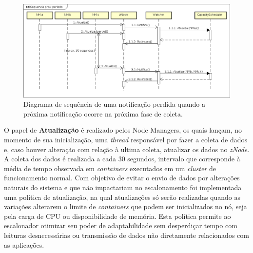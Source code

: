 \begin{figure}[!hbtn]
   \centering
   \includegraphics[width=\textwidth]{figuras/seq-prox-per.png}
   \caption{Diagrama de sequência de uma notificação perdida quando a próxima notificação ocorre na próxima fase de coleta.}
   \label{fig:proximo}
\end{figure}

	
O papel de \textbf{Atualização} é realizado pelos Node Managers, os quais lançam, no momento de sua inicialização, uma \textit{thread} responsável por fazer a coleta de dados e, caso houver alteração com relação à ultima coleta, atualizar os dados no \textit{zNode}. A coleta dos dados é realizada a cada 30 segundos, intervalo que corresponde à média de tempo observada em \textit{containers} executados em um \textit{cluster} de funcionamento normal. Com objetivo de evitar o envio de dados por alterações naturais do sistema e que não impactariam no escalonamento foi implementada uma política de atualização, na qual atualizações só serão realizadas quando as variações alterarem o limite de \textit{containers} que podem ser inicializados no nó, seja pela carga de CPU ou disponibilidade de memória. Esta política permite ao escalonador otimizar seu poder de adaptabilidade sem desperdiçar tempo com leituras desnecessárias ou transmissão de dados não diretamente relacionados com as aplicações.

